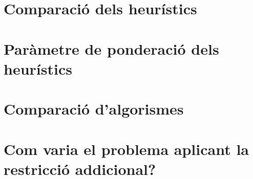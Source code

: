 \section{Comparació dels heurístics} %
\label{sec:comph1h2}



\newpage %
\section{Paràmetre de ponderació dels heurístics} %
\label{sec:expkh}



\newpage
\section{Comparació d'algorismes} %
\label{sec:comparacioalg}



\section{Com varia el problema aplicant la restricció addicional?} %
\label{sec:restadd}


